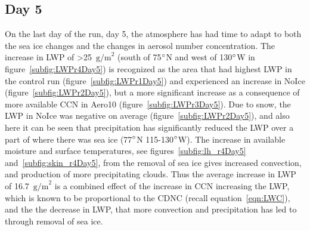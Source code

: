 \subsection{Day 5}
On the last day of the run, day 5, the atmosphere has had time to adapt to both the sea ice changes and the changes in aerosol number concentration. The increase in LWP of >25~$\text{g/m}^2$ (south of 75$\degree$N and west of 130$\degree$W in figure~\ref{subfig:LWPr4Day5}) is recognized as the area that had highest LWP in the control run (figure~\ref{subfig:LWPr1Day5}) and experienced an increase in NoIce (figure~\ref{subfig:LWPr2Day5}), but a more significant increase as a consequence of more available CCN in Aero10 (figure~\ref{subfig:LWPr3Day5}). Due to snow, the LWP in NoIce was negative on average (figure~\ref{subfig:LWPr2Day5}), and also here it can be seen that precipitation has significantly reduced the LWP over a part of where there was sea ice (77$\degree$N 115-130$\degree$W). The increase in available moisture and surface temperatures, see figures~\ref{subfig:lh_r4Day5} and~\ref{subfig:skin_r4Day5}, from the removal of sea ice gives increased convection, and production of more precipitating clouds. Thus the average increase in LWP of 16.7~$\text{g/m}^2$ is a combined effect of the increase in CCN increasing the LWP, which is known to be proportional to the CDNC (recall equation~\ref{eqn:LWC}), and the the decrease in LWP, that more convection and precipitation has led to through removal of sea ice.

